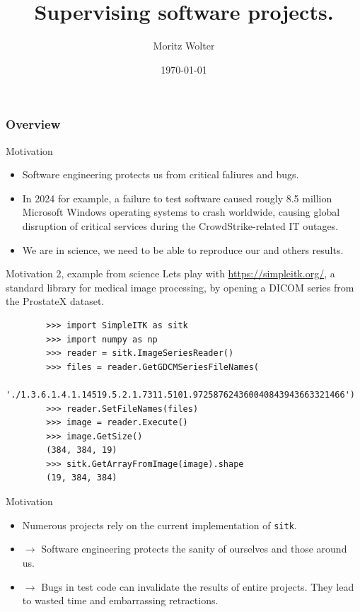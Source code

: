 \documentclass{beamer}
\title{Supervising software projects.}
\date{\today}
\institute{HPCA-Lab, Universität Bonn}
\author{Moritz Wolter}
\begin{document}
    \maketitle

    \begin{frame}
    \frametitle{Overview} 
    \tableofcontents
    \end{frame}
    

    \begin{frame}{Motivation}
      \begin{itemize}
        \item Software engineering protects us from critical faliures and bugs.
        \item In 2024 for example, a failure to test software caused rougly 8.5 million Microsoft Windows operating systems to crash worldwide, causing global disruption of critical services
        during the CrowdStrike-related IT outages.
        \item We are in science, we need to be able to reproduce our and others results.
      \end{itemize}
    \end{frame}

    \begin{frame}[fragile]{Motivation 2, example from science}
      Lets play with \url{https://simpleitk.org/}, a standard library for medical image processing,
      by opening a DICOM series from the ProstateX dataset.
      \begin{verbatim}
        >>> import SimpleITK as sitk
        >>> import numpy as np
        >>> reader = sitk.ImageSeriesReader()
        >>> files = reader.GetGDCMSeriesFileNames(
          './1.3.6.1.4.1.14519.5.2.1.7311.5101.972587624360040843943663321466')
        >>> reader.SetFileNames(files)
        >>> image = reader.Execute()
        >>> image.GetSize()
        (384, 384, 19)
        >>> sitk.GetArrayFromImage(image).shape
        (19, 384, 384)
      \end{verbatim}
    \end{frame}

    \begin{frame}{Motivation}
      \begin{itemize}
        \item Numerous projects rely on the current implementation of \texttt{sitk}.
        \item $\rightarrow$ Software engineering protects the sanity of ourselves and those around us.
        \item $\rightarrow$ Bugs in test code can invalidate the results of entire projects. They lead to wasted time and embarrassing retractions.
      \end{itemize}
    \end{frame}
\end{document}
